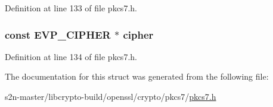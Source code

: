 Definition at line 133 of file pkcs7.\+h.

\subsubsection[{\texorpdfstring{cipher}{cipher}}]{\setlength{\rightskip}{0pt plus 5cm}const {\bf E\+V\+P\+\_\+\+C\+I\+P\+H\+ER} $\ast$ cipher}\hypertarget{structpkcs7__enc__content__st_a535356548694b85372c7d1fb18e05f1d}{}\label{structpkcs7__enc__content__st_a535356548694b85372c7d1fb18e05f1d}


Definition at line 134 of file pkcs7.\+h.



The documentation for this struct was generated from the following file\+:\begin{DoxyCompactItemize}
\item 
s2n-\/master/libcrypto-\/build/openssl/crypto/pkcs7/\hyperlink{crypto_2pkcs7_2pkcs7_8h}{pkcs7.\+h}\end{DoxyCompactItemize}
